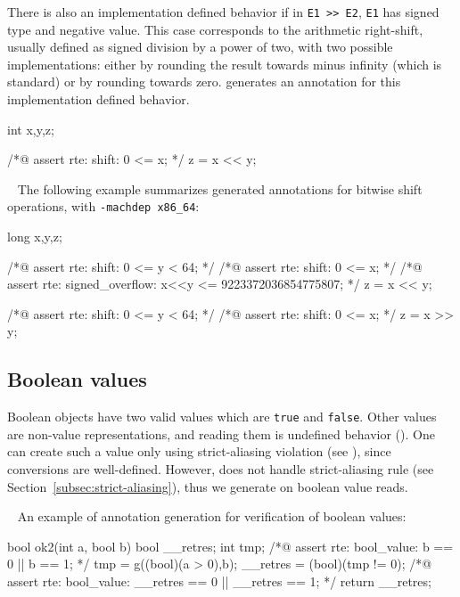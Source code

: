 There is also an implementation defined behavior if in \lstinline|E1 >> E2|,
\lstinline|E1| has signed type and negative value.  This case corresponds to the
arithmetic right-shift, usually defined as signed division by a power of two,
with two possible implementations: either by rounding the result towards minus
infinity (which is standard) or by rounding towards zero. \rte{} generates an
annotation for this implementation defined behavior.

\begin{listing-nonumber}
int x,y,z;

/*@ assert rte: shift: 0 <= x; */
z = x << y;
\end{listing-nonumber}

\begin{example} ~
The following example summarizes \rte{} generated annotations for bitwise shift
operations, with \lstinline|-machdep x86_64|:

\begin{listing-nonumber}
long x,y,z;

/*@ assert rte: shift: 0 <= y < 64; */
/*@ assert rte: shift: 0 <= x; */
/*@ assert rte: signed_overflow: x<<y <= 9223372036854775807; */
z = x << y;

/*@ assert rte: shift: 0 <= y < 64; */
/*@ assert rte: shift: 0 <= x; */
z = x >> y;
\end{listing-nonumber}

\end{example}

\subsection{Boolean values}

Boolean objects have two valid values which are \lstinline|true| and
\lstinline|false|. Other values are non-value representations, and reading
them is undefined behavior (). One can create such a value
only using strict-aliasing violation (see ), since conversions are
well-defined. However, \framac{} does not handle strict-aliasing rule (see
Section~\ref{subsec:strict-aliasing}), thus we generate on boolean value
reads.

\begin{example} ~
  An example of \rte{} annotation generation for verification of boolean values:
\begin{listing-nonumber}
bool ok2(int a, bool b)
{
  bool __retres;
  int tmp;
  /*@ assert rte: bool_value: b == 0 || b == 1; */
  tmp = g((bool)(a > 0),b);
  __retres = (bool)(tmp != 0);
  /*@ assert rte: bool_value: __retres == 0 || __retres == 1; */
  return __retres;
}

\end{listing-nonumber}
\end{example}

